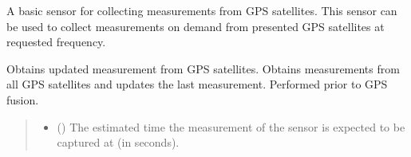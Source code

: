 \documentclass[letterpaper,10pt,english]{sphinxmanual}
\begin{document}
\begin{fulllineitems}
\label{\detokenize{modules/gps/sensor:qnav.gps.sensor.GpsSensor}}
\pysigstartsignatures
{}
\pysigstopsignatures
\sphinxAtStartPar
A basic sensor for collecting measurements from GPS satellites.
This sensor can be used to collect measurements on demand from
presented GPS satellites at requested frequency.

\begin{fulllineitems}
\label{\detokenize{modules/gps/sensor:qnav.gps.sensor.GpsSensor.take_measurement}}
\pysigstartsignatures
{}
\pysigstopsignatures
\sphinxAtStartPar
Obtains updated measurement from GPS satellites.
Obtains measurements from all GPS satellites and updates the last
measurement. Performed prior to GPS fusion.
\begin{quote}\begin{description}
\begin{itemize}
\item {} 
\sphinxAtStartPar
{} () \textendash{} The estimated time the measurement of the sensor
is expected to be captured at (in seconds).


\end{itemize}
\end{description}
\end{quote}
\end{fulllineitems}
\end{fulllineitems}
\end{document}
